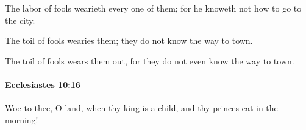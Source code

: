 			\begin{versebox}
					\item[BHS] 
					\item[LXX] 
					\item[ASV] The labor of fools wearieth every one of them; for he knoweth not how to go to the city.
					\item[NIV] The toil of fools wearies them; they do not know the way to town.
					\item[NRSV] The toil of fools wears them out, for they do not even know the way to town.
			\end{versebox}

		\paragraph{Ecclesiastes 10:16} %
			\label{ECCLESIASTES-10-16}

			Woe to thee, O land, when thy king is a child, and thy princes eat in the morning!


